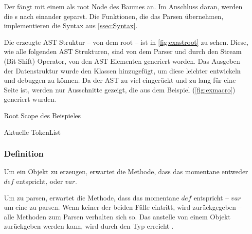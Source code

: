     Der  fängt mit einem  als root Node des Baumes an. Im Anschluss daran, werden die s nach einander geparst. Die Funktionen, die das Parsen übernehmen, implementieren die Syntax aus \autoref{ssec:Syntax}.

    Die erzeugte AST Struktur -- von dem root  -- ist in \autoref{fig:exastroot} zu sehen. Diese, wie alle folgenden AST Strukturen, sind von dem Parser und durch den Stream (Bit-Shift) Operator, von den AST Elementen generiert worden. Das Ausgeben der Datenstruktur wurde den  Klassen hinzugefügt, um diese leichter entwickeln und debuggen zu können. Da der AST zu viel eingerückt und zu lang für eine Seite ist, werden nur Ausschnitte gezeigt, die aus dem Beispiel (\autoref{fig:exmacro}) generiert wurden.
    \begin{paracol}{2}
      \begin{myCodeEnv}
        \centering
        \begin{myInvBox}[width=.9\linewidth]
          
        \end{myInvBox}
        \caption{Root Scope des Beispieles}
        \label{fig:exastroot}
      \end{myCodeEnv}
      \switchcolumn
      \begin{myCodeEnv}
        \centering
        \begin{myInvBox}[width=.9\linewidth]
          
        \end{myInvBox}
        \caption*{Aktuelle TokenList}
      \end{myCodeEnv}
    \end{paracol}

    \subsubsection{Definition}
    \label{sssec:Definition}
      Um ein  Objekt zu erzeugen, erwartet die  Methode, dass das momentane  entweder \myRIn$def$ entspricht, oder \myRIn$var$.

      Um  zu parsen, erwartet die Methode, dass das momentane  \myRIn$def$ entspricht -- \myRIn$var$ um eine  zu parsen. Wenn keiner der beiden Fälle eintritt, wird  zurückgegeben -- alle Methoden zum Parsen verhalten sich so. Das  anstelle von einem  Objekt zurückgeben werden kann, wird durch den  Typ erreicht \autocite{cpp-fundamentals}.

